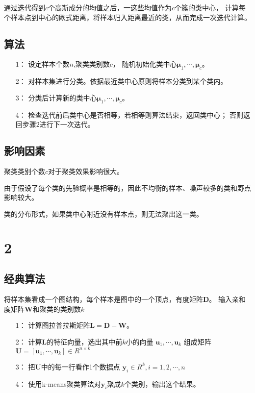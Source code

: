 \documentclass{article}
\begin{document}
通过迭代得到$c$个高斯成分的均值之后，一这些均值作为$c$个簇的类中心，
计算每个样本点到中心的欧式距离，将样本归入距离最近的类，从而完成一次迭代计算。

\subsection*{算法}
\begin{itemize}
	\item[1：] 设定样本个数$n$,聚类类别数$c$，
				随机初始化类中心${{\pmb{\mu} _1}, \cdots ,{\pmb{\mu} _c}}$。
	\item[2：] 对样本集进行分类。依据最近类中心原则将样本分类到某个类内。
	\item[3：] 分类后计算新的类中心${{\pmb{\mu} _1}, \cdots ,{\pmb{\mu} _c}}$。
	\item[4：] 检查迭代前后类中心是否相等，若相等则算法结束，返回类中心；
	           否则返回步骤2进行下一次迭代。  
\end{itemize}

\subsection*{影响因素}
聚类类别个数$c$对于聚类效果影响很大。

由于假设了每个类的先验概率是相等的，因此不均衡的样本、噪声较多的类和野点影响较大。

类的分布形式，如果类中心附近没有样本点，则无法聚出这一类。

\section*{2}
\subsection*{经典算法}
将样本集看成一个图结构，每个样本是图中的一个顶点，有度矩阵$\pmb{D}$。
输入亲和度矩阵$\pmb{W}$和聚类的类别数$k$
\begin{itemize}
	\item[1：] 计算图拉普拉斯矩阵$\pmb{L} = \pmb{D} - \pmb{W}$。
	\item[2：] 计算$\pmb{L}$的特征向量，选出其中前$k$小的向量
	${{\pmb{u} _1}, \cdots ,{\pmb{u} _k}}$
	组成矩阵$\pmb{U} = \left[ {{\pmb{u}_1}, \cdots ,{\pmb{u}_k}} \right] \in {R^{n \times k}}$
	\item[3：] 把$\pmb{U}$中的每一行看作1个数据点
	${\pmb{y}_i} \in {R^k},i = 1,2, \cdots ,n$
	\item[4：] 使用k-means聚类算法对${\pmb{y}_i}$聚成$k$个类别，输出这个结果。
\end{itemize}
\end{document}
